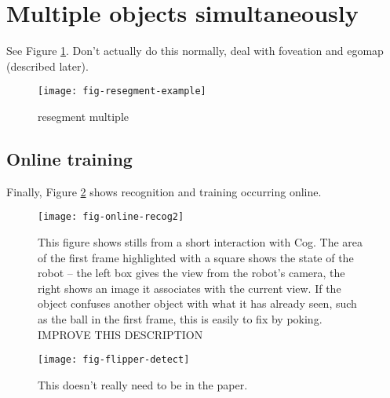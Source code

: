 \section{Multiple objects simultaneously}

See Figure \ref{fig:resegment-multiple}.
Don't actually do this normally, deal with foveation
and egomap (described later).


\begin{figure}[tb]
\centerline{\texttt{[image: fig-resegment-example]}}
\caption[Hands-free segmentation]{ 
%
resegment multiple
%
}
\label{fig:resegment-multiple}
\end{figure}




\subsection{Online training}

Finally, Figure \ref{fig:resegment-online} shows recognition
and training occurring online.



\begin{figure}[tbh]
\centerline{\texttt{[image: fig-online-recog2]}}
\caption[Another example]{ 
%
This figure shows stills from a short interaction with Cog.
The area of the first frame highlighted with a square shows the state
of the robot -- the left box gives the view from the robot's camera,
the right shows an image it associates with the current view.
If the object confuses another object with what it has already seen,
such as the ball in the first frame, this is easily to fix
by poking.  IMPROVE THIS DESCRIPTION
%
}
\label{fig:resegment-online}
\end{figure}


\begin{figure}[tb]
\begin{center}
\texttt{[image: fig-flipper-detect]}
\caption{ 
\label{fig:flipper-detect}
%
This doesn't really need to be in the paper.
%
}
\end{center}
\end{figure}


